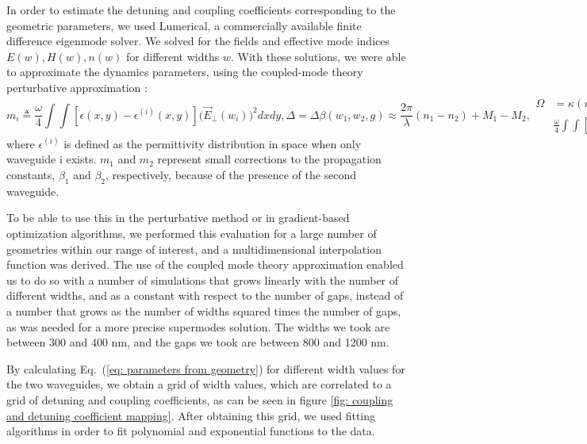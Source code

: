 \documentclass[floatfix,reprint, amsmath,amssymb,aps,superscriptaddress,nofootinbib]{revtex4-2}
\begin{document}
In order to estimate the detuning and coupling coefficients corresponding to the geometric parameters, we used Lumerical, a commercially available finite difference eigenmode solver.
We solved for the fields and effective mode indices $E(w), H(w), n(w)$ for different widths $w$.
With these solutions, we were able to approximate the dynamics parameters, using the coupled-mode theory perturbative approximation \cite{QuantumElectronicsYariv1989}:
\begin{subequations}
    \begin{equation}
    m_i \triangleq  \frac{\omega}{4}\int \int [\epsilon(x,y) - \epsilon^{(i)}(x,y)]
    \Big(\vec{E}_{\perp}(w_i)\Big)^2 dxdy ,
    \end{equation}
    \begin{equation}
        \Delta=\Delta\beta (w_1, w_2, g) \approx \frac{2\pi}{\lambda}(n_1 - n_2) + M_1 - M_2 ,
    \end{equation}
    \begin{equation}
    \begin{split}
        \Omega & = \kappa (w_1, w_2, g) \approx \\ & \frac{\omega}{4}\int \int [\epsilon(x,y) - \epsilon^{(2)}(x,y)]
        \vec{E}_{\perp}(w_1)\cdot \vec{E}_{\perp}(w_2) dxdy ,
\end{split}
    \end{equation}
    \label{eq: parameters from geometry}
\end{subequations}
where $\epsilon^{(i)}$ is defined as the permittivity distribution in space when only waveguide i exists. $m_1$ and $m_2$ represent small corrections to the propagation constants, $\beta_1$ and $\beta_2$, respectively, because of the presence of the second waveguide.

To be able to use this in the perturbative method or in gradient-based optimization algorithms, we performed this evaluation for a large number of geometries within our range of interest, and a multidimensional interpolation function was derived. The use of the coupled mode theory approximation enabled us to do so with a number of simulations that grows linearly with the number of different widths, and as a constant with respect to the number of gaps, instead of a number that grows as the number of widths squared times the number of gaps, as was needed for a more precise supermodes solution. The widths we took are between 300 and 400 nm, and the gaps we took are between 800 and 1200 nm. 

By calculating Eq.~(\ref{eq: parameters from geometry}) for different width values for the two waveguides, we obtain a grid of width values, which are correlated to a grid of detuning and coupling coefficients, as can be seen in figure \ref{fig: coupling and detuning coefficient mapping}.
After obtaining this grid, we used fitting algorithms in order to fit polynomial and exponential functions to the data. 
\end{document}
